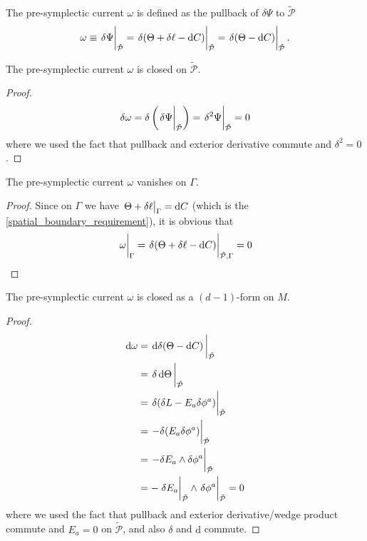 \documentclass[10pt]{article}
\begin{document}
\begin{definition}
    The pre-symplectic current $\omega$ is defined as the pullback of $\delta\Psi$ to $\tilde{\mathcal{P}}$
    \begin{equation}
        \omega\equiv\eval{\delta\Psi}_{\tilde{\mathcal{P}}}=\eval{\delta(\Theta+\delta\ell-\dd{C})}_{\tilde{\mathcal{P}}}=\eval{\delta(\Theta-\dd{C})}_{\tilde{\mathcal{P}}}.\label{eq:def_sym_curr}
    \end{equation}
\end{definition}
\begin{claim}
    The pre-symplectic current $\omega$ is closed on $\tilde{\mathcal{P}}$.
\end{claim}
\begin{proof}
\begin{equation}
    \delta\omega=\delta\left(\eval{\delta\Psi}_{\tilde{\mathcal{P}}}\right)=\eval{\delta^2\Psi}_{\tilde{\mathcal{P}}}=0
\end{equation}
where we used the fact that pullback and exterior derivative commute and $\delta^2=0$.
\end{proof}
\begin{claim}
    The pre-symplectic current $\omega$ vanishes on $\Gamma$.
\end{claim}
\begin{proof}
    Since on $\Gamma$ we have $\eval{\Theta+\delta\ell}_\Gamma=\dd{C}$ (which is the \cref{spatial_boundary_requirement}), it is obvious that
    \begin{equation}
        \eval{\omega}_\Gamma=\eval{\delta(\Theta+\delta\ell-\dd{C})}_{\tilde{\mathcal{P}},\Gamma}=0
    \end{equation}
\end{proof}
\begin{claim}
    The pre-symplectic current $\omega$ is closed as a $(d-1)$-form on $M$.
\end{claim}
\begin{proof}
    \begin{equation}
        \begin{split}
            \dd{\omega}&=\eval{\dd{\delta(\Theta-\dd{C})}}_{\tilde{\mathcal{P}}}\\
                       &=\eval{\delta\dd{\Theta}}_{\tilde{\mathcal{P}}}\\
                       &=\eval{\delta(\delta L-E_a\delta\phi^a)}_{\tilde{\mathcal{P}}}\\
                       &=\eval{-\delta( E_a\delta\phi^a)}_{\tilde{\mathcal{P}}}\\
                       &=\eval{-\delta E_a\wedge\delta\phi^a}_{\tilde{\mathcal{P}}}\\
                       &=-\eval{\delta E_a}_{\tilde{\mathcal{P}}}\wedge\eval{\delta\phi^a}_{\tilde{\mathcal{P}}}=0
        \end{split}
    \end{equation}
    where we used the fact that pullback and exterior derivative/wedge product commute and $E_a=0$ on $\tilde{\mathcal{P}}$, and also $\delta$ and $\mathrm{d}$ commute.
\end{proof}
\end{document}
